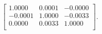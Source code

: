 \begin{equation*}
\begin{bmatrix}
  1.0000 &   0.0001 &  -0.0000 \\
 -0.0001 &   1.0000 &  -0.0033 \\
  0.0000 &   0.0033 &   1.0000 \\
\end{bmatrix}.
\end{equation*}
